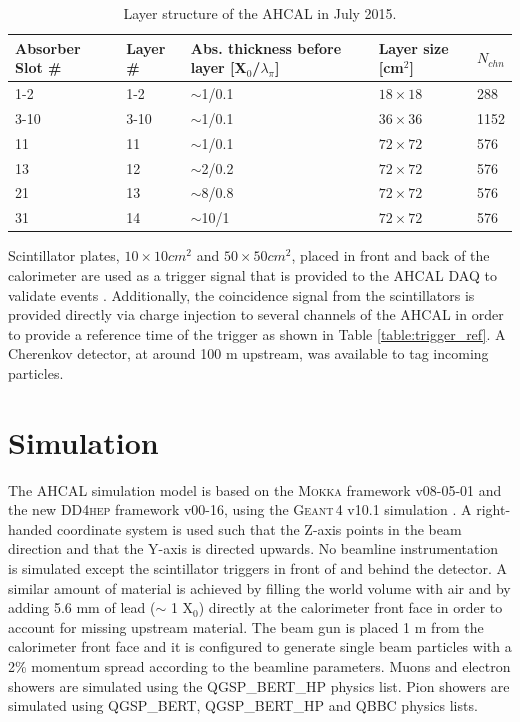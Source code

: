 \documentclass{JINST}
\newcommand\geant{\textsc{Geant\,4}\xspace}
\newcommand\mokka{\textsc{Mokka}\xspace}
\newcommand\ddhep{\textsc{DD4hep}\xspace}
\begin{document}
\begin{table}[htb!]
  \centering
  \caption{Layer structure of the AHCAL in July 2015.}
  \label{table:AHCALlayer_structure}
  \begin{tabular}{@{}lllll@{}}
    \toprule
    Absorber Slot \# & Layer \# & Abs. thickness before layer [X$_0$/$\lambda_{\pi}$] & Layer size [cm$^{2}$] & $N_{chn}$\\
    \midrule
    1-2 & 1-2 & $\sim$1/0.1 & $18\times18$ & 288\\
    3-10 & 3-10 & $\sim$1/0.1 & $36\times36$ & 1152\\
    11 & 11 & $\sim$1/0.1 & $72\times72$ & 576\\
    13 & 12 & $\sim$2/0.2 & $72\times72$ & 576\\
    21 & 13 & $\sim$8/0.8 & $72\times72$ & 576\\
    31 & 14 & $\sim$10/1 & $72\times72$ & 576\\
    \bottomrule
  \end{tabular}
\end{table}

Scintillator plates, $10\times10 cm^2$ and $50\times50 cm^2$, placed in front and back of the calorimeter are used as a trigger signal that is provided to the AHCAL DAQ to validate events \cite{Kvasnicka:CR_IEEE2016}. Additionally, the coincidence signal from the scintillators is provided directly via charge injection to several channels of the AHCAL in order to provide a reference time of the trigger as shown in Table \ref{table:trigger_ref}. A Cherenkov detector, at around 100 m upstream, was available to tag incoming particles.

\section{Simulation}

The AHCAL simulation model is based on the \mokka \cite{MoradeFreitas:2002kj} framework v08-05-01 and the new \ddhep \cite{Frank:2014zya} framework v00-16, using the \geant v10.1 simulation \cite{Agostinelli2003}. A right-handed coordinate system is used such that the Z-axis points in the beam direction and that the Y-axis is directed upwards. No beamline instrumentation is simulated except the scintillator triggers in front of and behind the detector. A similar amount of material is achieved by filling the world volume with air and by adding 5.6 mm of lead ($\sim$ 1 X$_0$) directly at the calorimeter front face in order to account for missing upstream material. The beam gun is placed 1 m from the calorimeter front face and it is configured to generate single beam particles with a 2\% momentum spread according to the beamline parameters. Muons and electron showers are simulated using the QGSP\_BERT\_HP physics list. Pion showers are simulated using QGSP\_BERT, QGSP\_BERT\_HP and QBBC physics lists.
\end{document}
